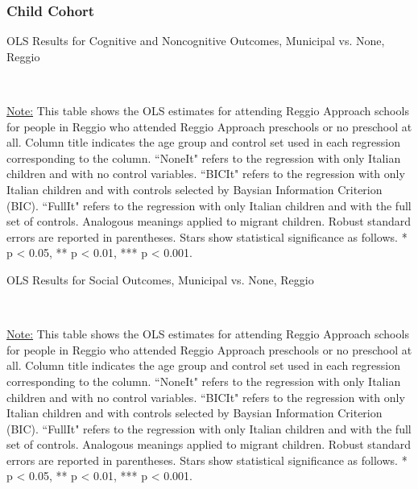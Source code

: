 \subsubsection{Child Cohort}

\begin{table}[H] \caption{OLS Results for Cognitive and Noncognitive Outcomes, Municipal vs. None, Reggio} \label{ols-CN-child-reg}

\vspace{1ex} \\
\footnotesize\raggedright{\underline{Note:} This table shows the OLS estimates for attending Reggio Approach schools for people in Reggio who attended Reggio Approach preschools or no preschool at all. Column title indicates the age group and control set used in each regression corresponding to the column. ``NoneIt" refers to the regression with only Italian children and with no control variables. ``BICIt" refers to the regression with only Italian children and with controls selected by Baysian Information Criterion (BIC). ``FullIt" refers to the regression with only Italian children and with the full set of controls. Analogous meanings applied to migrant children. Robust standard errors are reported in parentheses. Stars show statistical significance as follows. * p < 0.05, ** p < 0.01, *** p < 0.001.}
\end{table}

\begin{table}[H] \caption{OLS Results for Social Outcomes, Municipal vs. None, Reggio} \label{ols-S-child-reg}

\vspace{1ex} \\
\footnotesize\raggedright{\underline{Note:} This table shows the OLS estimates for attending Reggio Approach schools for people in Reggio who attended Reggio Approach preschools or no preschool at all. Column title indicates the age group and control set used in each regression corresponding to the column. ``NoneIt" refers to the regression with only Italian children and with no control variables. ``BICIt" refers to the regression with only Italian children and with controls selected by Baysian Information Criterion (BIC). ``FullIt" refers to the regression with only Italian children and with the full set of controls. Analogous meanings applied to migrant children. Robust standard errors are reported in parentheses. Stars show statistical significance as follows. * p < 0.05, ** p < 0.01, *** p < 0.001.}
\end{table}


